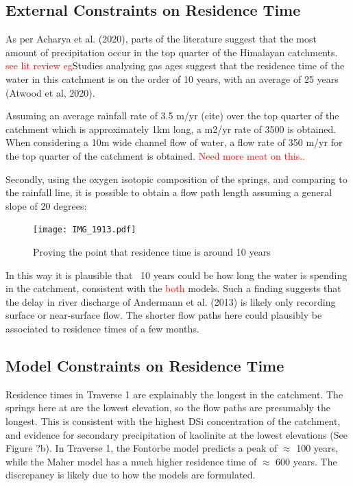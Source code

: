 \subsection{External Constraints on Residence Time}

As per Acharya et al. (2020), parts of the literature suggest that the most amount of precipitation occur in the top quarter of the Himalayan catchments. \textcolor{red}{see lit review eg}Studies analysing gas ages %
suggest that the residence time of the water in this catchment is on the order of 10 years, with an average of 25 years (Atwood et al, 2020). 

\bsk

Assuming an average rainfall rate of 3.5 m/yr (cite) over the top quarter of the catchment which is approximately 1km long, a m2/yr rate of 3500 is obtained. When considering a 10m wide channel flow of water, a flow rate of 350 m/yr for the top quarter of the catchment is obtained. \textcolor{red}{Need more meat on this..}

\bsk

Secondly, using the oxygen isotopic composition of the springs, and comparing to the rainfall line, it is possible to obtain a flow path length assuming a general slope of 20 degrees:



\begin{figure}[h]
    \centering
    \texttt{[image: IMG\_1913.pdf]}
    \caption{Proving the point that residence time is around 10 years}
    \label{fig:discussion7}
\end{figure}

\FloatBarrier


In this way it is plausible that ~10 years could be how long the water is spending in the catchment, consistent with the \textcolor{red}{both} models. Such a finding suggests that the delay in river discharge of Andermann et al. (2013) is likely only recording surface or near-surface flow. The shorter flow paths here could plausibly be associated to residence times of a few months. 


\subsection{Model Constraints on Residence Time}

Residence times in Traverse 1 are explainably the longest in the catchment. The springs here at are the lowest elevation, so the flow paths are presumably the longest. This is consistent with the highest DSi concentration of the catchment, and evidence for secondary precipitation of kaolinite at the lowest elevations (See Figure ?b). In Traverse 1, the Fontorbe model predicts a peak of $\approx$ 100 years, while the Maher model has a much higher residence time of $\approx$ 600 years. The discrepancy is likely due to how the models are formulated.

